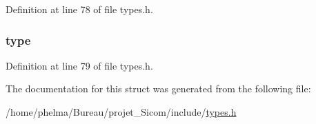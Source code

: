 Definition at line 78 of file types.\-h.

\hypertarget{struct__text___a92c69ddff0b8be636cead81c5b73f667}{
\subsubsection[{type}]{ type}}\label{struct__text___a92c69ddff0b8be636cead81c5b73f667}


Definition at line 79 of file types.\-h.



The documentation for this struct was generated from the following file\-:\begin{DoxyCompactItemize}
\item 
/home/phelma/\-Bureau/projet\-\_\-\-Sicom/include/\hyperlink{types_8h}{types.\-h}\end{DoxyCompactItemize}
